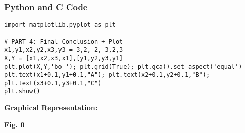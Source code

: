 \documentclass{beamer}
\begin{document}
    \begin{frame}[fragile]
\frametitle{Python and C Code}

\begin{lstlisting}
import matplotlib.pyplot as plt

# PART 4: Final Conclusion + Plot
x1,y1,x2,y2,x3,y3 = 3,2,-2,-3,2,3
X,Y = [x1,x2,x3,x1],[y1,y2,y3,y1]
plt.plot(X,Y,'bo-'); plt.grid(True); plt.gca().set_aspect('equal')
plt.text(x1+0.1,y1+0.1,"A"); plt.text(x2+0.1,y2+0.1,"B"); plt.text(x3+0.1,y3+0.1,"C")
plt.show()
\end{lstlisting}

\end{frame}



\textbf{Graphical Representation:}

\begin{center}
    
    \vspace{0.5cm} %
    \textbf{Fig. 0}

\end{center}
\end{document}
